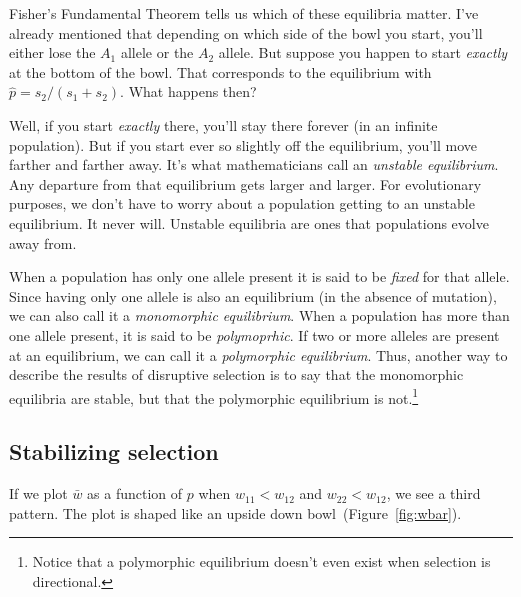 \documentclass[12pt]{article}
\begin{document}
Fisher's Fundamental Theorem tells us which of these equilibria
matter. I've already mentioned that depending on which side of the
bowl you start, you'll either lose the $A_1$ allele or the $A_2$
allele. But suppose you happen to start {\it exactly\/} at the bottom
of the bowl. That corresponds to the equilibrium with $\hat p =
s_2/(s_1+s_2)$. What happens then?

Well, if you start {\it exactly\/} there, you'll stay there forever
(in an infinite population). But if you start ever so slightly off the
equilibrium, you'll move farther and farther away. It's what
mathematicians call an {\it unstable equilibrium}. Any departure from
that equilibrium gets larger and larger. For evolutionary purposes, we
don't have to worry about a population getting to an unstable
equilibrium. It never will. Unstable equilibria are ones that
populations evolve away from.

When a population has only one allele present it is said to be {\it
  fixed\/} for that allele. Since having only one allele is also an
equilibrium (in the absence of mutation), we can also call it a {\it
  monomorphic equilibrium}. When a population has more than one allele
present, it is said to be {\it polymoprhic}. If two or more alleles
are present at an equilibrium, we can call it a {\it polymorphic
  equilibrium}. Thus, another way to describe the results of
disruptive selection is to say that the monomorphic equilibria are
stable, but that the polymorphic equilibrium is not.\footnote{Notice that a
  polymorphic equilibrium doesn't even exist when selection is
  directional.}

\subsection*{Stabilizing selection}

If we plot $\bar w$ as a function of $p$ when $w_{11} < w_{12}$ and
$w_{22} < w_{12}$, we see a third pattern. The plot is shaped like an
upside down bowl~(Figure~\ref{fig:wbar}).
\end{document}
